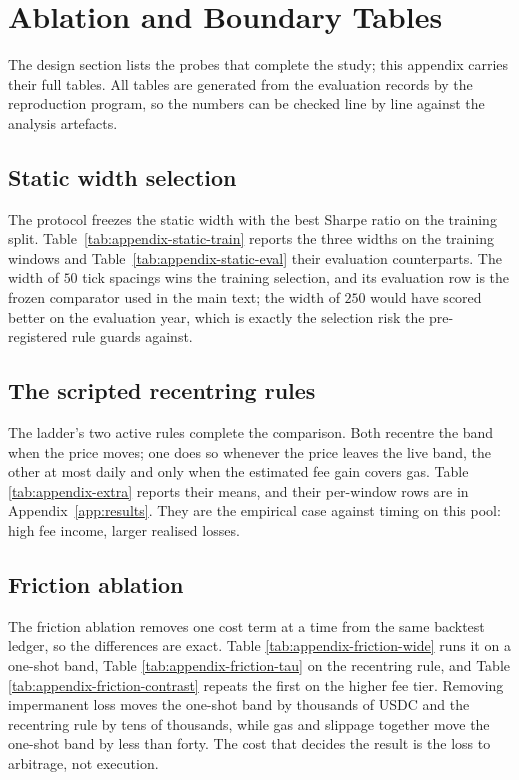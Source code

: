 \section{Ablation and Boundary Tables}
\label{app:ablations}

The design section lists the probes that complete the study; this appendix
carries their full tables. All tables are generated from the evaluation
records by the reproduction program, so the numbers can be checked line by
line against the analysis artefacts.

\subsection{Static width selection}

The protocol freezes the static width with the best Sharpe ratio on the
training split. Table~\ref{tab:appendix-static-train} reports the three widths
on the training windows and Table~\ref{tab:appendix-static-eval} their
evaluation counterparts. The width of $50$ tick spacings wins the training
selection, and its evaluation row is the frozen comparator used in the main
text; the width of $250$ would have scored better on the evaluation year,
which is exactly the selection risk the pre-registered rule guards against.



\subsection{The scripted recentring rules}

The ladder's two active rules complete the comparison. Both recentre the band
when the price moves; one does so whenever the price leaves the live band, the
other at most daily and only when the estimated fee gain covers gas. Table
\ref{tab:appendix-extra} reports their means, and their per-window rows are in
Appendix~\ref{app:results}. They are the empirical case against timing on this
pool: high fee income, larger realised losses.



\subsection{Friction ablation}

The friction ablation removes one cost term at a time from the same backtest
ledger, so the differences are exact. Table
\ref{tab:appendix-friction-wide} runs it on a one-shot band, Table
\ref{tab:appendix-friction-tau} on the recentring rule, and Table
\ref{tab:appendix-friction-contrast} repeats the first on the higher fee tier.
Removing impermanent loss moves the one-shot band by thousands of USDC and the
recentring rule by tens of thousands, while gas and slippage together move the
one-shot band by less than forty. The cost that decides the result is the loss
to arbitrage, not execution.

